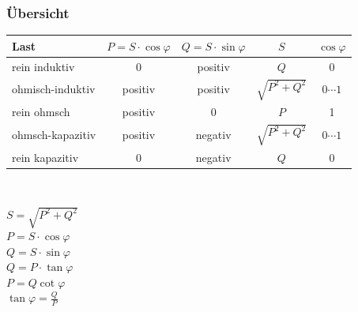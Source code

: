 		\subsubsection{Übersicht}
			\begin{centering}
			\begin{tabular}{|l|c|c|c|c|}
				\hline
					Last & $P=S\cdot\cos\varphi$ & $Q=S\cdot\sin\varphi$ & $S$ & $\cos\varphi$
					\\
				\hline
					rein induktiv & 0 & positiv & $Q$ & 0\\
				\hline
					ohmisch-induktiv & positiv & positiv & $\sqrt{P^2+Q^2}$& $0\cdots1$\\
				\hline
					rein ohmsch & positiv & 0 & $P$ & 1 \\
				\hline
					ohmsch-kapazitiv & positiv & negativ & $\sqrt{P^2+Q^2}$& $0\cdots1$\\
				\hline
					rein kapazitiv & 0 & negativ & $Q$ & 0 \\
				\hline
			\end{tabular}\\
				\end{centering}
		\begin{multicols}{2}
				$S=\sqrt{P^2+Q^2}$\\
				$P=S\cdot \cos \varphi$\\
				$Q=S\cdot\sin\varphi$\\
				$Q=P\cdot\tan\varphi$\\
				$P=Q\cot\varphi$\\
				$\tan\varphi=\frac{Q}{P}$	
		\end{multicols}
